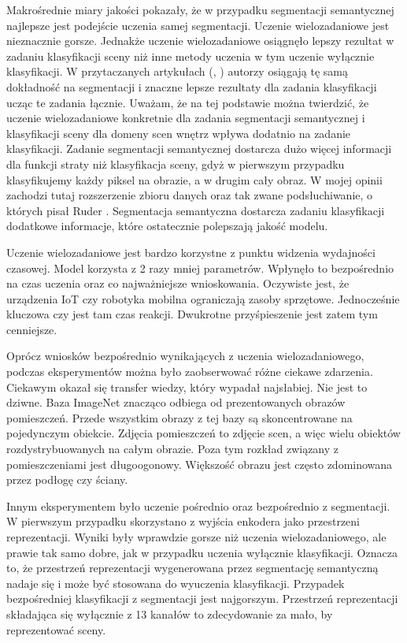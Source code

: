 Makrośrednie miary jakości pokazały, że w przypadku segmentacji semantycznej najlepsze jest podejście uczenia samej segmentacji. Uczenie wielozadaniowe jest nieznacznie gorsze. Jednakże uczenie wielozadaniowe osiągnęło lepszy rezultat w zadaniu klasyfikacji sceny niż inne metody uczenia w tym uczenie wyłącznie klasyfikacji. W przytaczanych artykułach (\cite{mehta2018net}, \cite{9892852}) autorzy osiągają tę samą dokładność na segmentacji i znaczne lepsze rezultaty dla zadania klasyfikacji ucząc te zadania łącznie. Uważam, że na tej podstawie można twierdzić, że uczenie wielozadaniowe konkretnie dla zadania segmentacji semantycznej i klasyfikacji sceny dla domeny scen wnętrz wpływa dodatnio na zadanie klasyfikacji. Zadanie segmentacji semantycznej dostarcza dużo więcej informacji dla funkcji straty niż klasyfikacja sceny, gdyż w pierwszym przypadku klasyfikujemy każdy piksel na obrazie, a w drugim cały obraz. W mojej opinii zachodzi tutaj rozszerzenie zbioru danych oraz tak zwane podsłuchiwanie, o których pisał Ruder \cite{ruder2017overview}. Segmentacja semantyczna dostarcza zadaniu klasyfikacji dodatkowe informacje, które ostatecznie polepszają jakość modelu.

Uczenie wielozadaniowe jest bardzo korzystne z punktu widzenia wydajności czasowej. Model korzysta z 2 razy mniej parametrów. Wpłynęło to bezpośrednio na czas uczenia oraz co najważniejsze wnioskowania. Oczywiste jest, że urządzenia IoT czy robotyka mobilna ograniczają zasoby sprzętowe. Jednocześnie kluczowa czy jest tam czas reakcji. Dwukrotne przyśpieszenie jest zatem tym cenniejsze.

Oprócz wniosków bezpośrednio wynikających z uczenia wielozadaniowego, podczas eksperymentów można było zaobserwować różne ciekawe zdarzenia. Ciekawym okazał się transfer wiedzy, który wypadał najsłabiej. Nie jest to dziwne. Baza ImageNet znacząco odbiega od prezentowanych obrazów pomieszczeń. Przede wszystkim obrazy z tej bazy są skoncentrowane na pojedynczym obiekcie. Zdjęcia pomieszczeń to zdjęcie scen, a więc wielu obiektów rozdystrybuowanych na całym obrazie. Poza tym rozkład związany z pomieszczeniami jest długoogonowy. Większość obrazu jest często zdominowana przez podłogę czy ściany.

Innym eksperymentem było uczenie pośrednio oraz bezpośrednio z segmentacji. W pierwszym przypadku skorzystano z wyjścia enkodera jako przestrzeni reprezentacji. Wyniki były wprawdzie gorsze niż uczenia wielozadaniowego, ale prawie tak samo dobre, jak w przypadku uczenia wyłącznie klasyfikacji. Oznacza to, że przestrzeń reprezentacji wygenerowana przez segmentację semantyczną nadaje się i może być stosowana do wyuczenia klasyfikacji. Przypadek bezpośredniej klasyfikacji z segmentacji jest najgorszym. Przestrzeń reprezentacji składająca się wyłącznie z 13 kanałów to zdecydowanie za mało, by reprezentować sceny.

